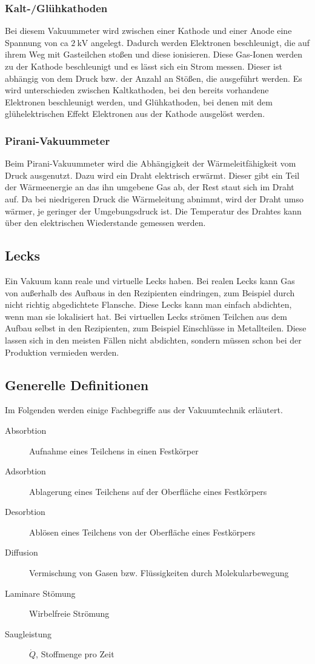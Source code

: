 \subsubsection{Kalt-/Glühkathoden}
Bei diesem Vakuummeter wird zwischen einer Kathode und einer Anode eine Spannung von ca $\SI{2}{\kilo \volt}$ angelegt. Dadurch werden Elektronen
beschleunigt, die auf ihrem Weg mit Gasteilchen stoßen und diese ionisieren. Diese Gas-Ionen werden zu der Kathode beschleunigt und es lässt sich ein
Strom messen. Dieser ist abhängig von dem Druck bzw. der Anzahl an Stößen, die ausgeführt werden. Es wird unterschieden zwischen Kaltkathoden, bei den bereits
vorhandene Elektronen beschleunigt werden, und Glühkathoden, bei denen mit dem glühelektrischen Effekt Elektronen aus der Kathode ausgelöst werden.
\subsubsection{Pirani-Vakuummeter}
Beim Pirani-Vakuummeter wird die Abhängigkeit der Wärmeleitfähigkeit vom Druck ausgenutzt. Dazu wird ein Draht elektrisch erwärmt. Dieser gibt ein Teil der
Wärmeenergie an das ihn umgebene Gas ab, der Rest staut sich im Draht auf. Da bei niedrigeren Druck die Wärmeleitung abnimmt, wird der Draht umso wärmer, je
geringer der Umgebungsdruck ist. Die Temperatur des Drahtes kann über den elektrischen Wiederstande gemessen werden.
\subsection{Lecks}
Ein Vakuum kann reale und virtuelle Lecks haben. Bei realen Lecks kann Gas von außerhalb des Aufbaus in den Rezipienten eindringen, zum Beispiel durch
nicht richtig abgedichtete Flansche. Diese Lecks kann man einfach abdichten, wenn man sie lokalisiert hat. Bei virtuellen Lecks strömen Teilchen aus dem
Aufbau selbst in den Rezipienten, zum Beispiel Einschlüsse in Metallteilen. Diese lassen sich in den meisten Fällen nicht abdichten, sondern müssen schon
bei der Produktion vermieden werden.
\subsection{Generelle Definitionen}
Im Folgenden werden einige Fachbegriffe aus der Vakuumtechnik erläutert.
\begin{description}
	\item[Absorbtion] Aufnahme eines Teilchens in einen Festkörper
	\item[Adsorbtion] Ablagerung eines Teilchens auf der Oberfläche eines Festkörpers
	\item[Desorbtion] Ablösen eines Teilchens von der Oberfläche eines Festkörpers
	\item[Diffusion] Vermischung von Gasen bzw. Flüssigkeiten durch Molekularbewegung
	\item[Laminare Stömung] Wirbelfreie Strömung
	\item[Saugleistung] $\dot{Q}$, Stoffmenge pro Zeit
\end{description}
